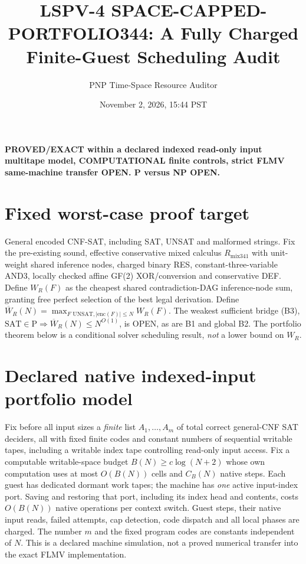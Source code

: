 \documentclass[11pt]{article}
\title{LSPV-4 SPACE-CAPPED-PORTFOLIO344: A Fully Charged Finite-Guest Scheduling Audit}
\author{PNP Time-Space Resource Auditor}
\date{November 2, 2026, 15:44 PST}
\begin{document}
\maketitle
\noindent\textbf{PROVED/EXACT within a declared indexed read-only input multitape model, COMPUTATIONAL finite controls, strict FLMV same-machine transfer OPEN. P versus NP OPEN.}

\section*{Fixed worst-case proof target}
General encoded CNF-SAT, including SAT, UNSAT and malformed strings. Fix the pre-existing sound, effective conservative mixed calculus $R_{\mathrm{mix341}}$ with unit-weight shared inference nodes, charged binary RES, constant-three-variable AND3, locally checked affine GF(2) XOR/conversion and conservative DEF. Define $W_R(F)$ as the cheapest shared contradiction-DAG inference-node sum, granting free perfect selection of the best legal derivation. Define $\overline W_R(N)=\max_{F\text{ UNSAT},|\mathrm{enc}(F)|\le N} W_R(F)$. The weakest sufficient bridge (B3), $\mathrm{SAT}\in\mathrm P\Rightarrow\overline W_R(N)\le N^{O(1)}$, is OPEN, as are B1 and global B2. The portfolio theorem below is a conditional solver scheduling result, \emph{not} a lower bound on $W_R$.

\section*{Declared native indexed-input portfolio model}
Fix before all input sizes a \emph{finite} list $A_1,\ldots,A_m$ of total correct general-CNF SAT deciders, all with fixed finite codes and constant numbers of sequential writable tapes, including a writable index tape controlling read-only input access. Fix a computable writable-space budget $B(N)\ge c\log(N+2)$ whose own computation uses at most $O(B(N))$ cells and $C_B(N)$ native steps. Each guest has dedicated dormant work tapes; the machine has \emph{one} active input-index port. Saving and restoring that port, including its index head and contents, costs $O(B(N))$ native operations per context switch. Guest steps, their native input reads, failed attempts, cap detection, code dispatch and all local phases are charged. The number $m$ and the fixed program codes are constants independent of $N$. This is a declared machine simulation, not a proved numerical transfer into the exact FLMV implementation.
\end{document}
